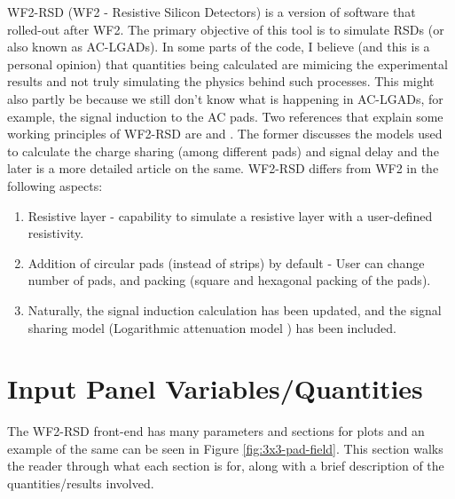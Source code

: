 \documentclass[11pt]{article}
\begin{document}
WF2-RSD (WF2 - Resistive Silicon Detectors) is a version of software that rolled-out after WF2. The primary objective of this tool is to simulate RSDs (or also known as AC-LGADs). In some parts of the code, I believe (and this is a personal opinion) that quantities being calculated are mimicing the experimental results and not truly simulating the physics behind such processes. This might also partly be because we still don't know what is happening in AC-LGADs, for example, the signal induction to the AC pads.
\newline
Two references that explain some working principles of WF2-RSD are \cite{wf2-rsd-working-principles} and \cite{Tornago2021}. The former discusses the models used to calculate the charge sharing (among different pads) and signal delay and the later is a more detailed article on the same.
\newline
WF2-RSD differs from WF2 in the following aspects:
\begin{enumerate}
    \item Resistive layer - capability to simulate a resistive layer with a user-defined resistivity.
    \item Addition of circular pads (instead of strips) by default - User can change number of pads, and packing (square and hexagonal packing of the pads).
    \item Naturally, the signal induction calculation has been updated, and the signal sharing model (Logarithmic attenuation model \cite{Tornago2021}) has been included.
\end{enumerate}

\section{Input Panel Variables/Quantities}
The WF2-RSD front-end has many parameters and sections for plots and an example of the same can be seen in Figure \ref{fig:3x3-pad-field}. This section walks the reader through what each section is for, along with a brief description of the quantities/results involved.
\end{document}
